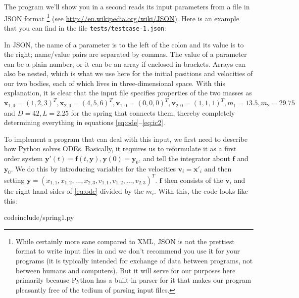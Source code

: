 \documentclass{article}
\begin{document}
The program we'll show you in a second reads its input parameters from a file in JSON format%
\footnote{While certainly more sane compared to XML, JSON is not the prettiest format to write input files in and we
  don't recommend you use it for your programs (it is typically intended for
  exchange of data between programs, not between humans and computers). But it
  will serve for our purposes here primarily because Python has a built-in
  parser for it that makes our program pleasantly free of the tedium of
  parsing input files.} (see
\url{http://en.wikipedia.org/wiki/JSON}).
Here is an example that you can find in the file \texttt{tests/testcase-1.json}:

In JSON, the name of a parameter is to the left of the colon and its value is
to the right; name/value pairs are separated by commas. The value of a
parameter can be a plain number, or it can be an array if enclosed in
brackets. Arrays can also be nested, which is what we use here for the initial
positions and velocities of our two bodies, each of which lives in
three-dimensional space. With this explanation, it is clear that the input file
specifies properties of the two masses as $\mathbf x_{1,0}=(1,2,3)^T, \mathbf
x_{2,0}=(4,5,6)^T, \mathbf v_{1,0}=(0,0,0)^T, \mathbf v_{2,0}=(1,1,1)^T,
m_1=13.5, m_2=29.75$ and $D=42, L=2.25$ for the spring that connects them, 
thereby completely determining everything in equations
\eqref{eq:ode}--\eqref{eq:ic2}.

To implement a program that can deal with this input, we first need to
describe how Python solves ODEs. Basically, it requires us to reformulate it
as a first order system $\mathbf y'(t)=\mathbf f(t,\mathbf y), \mathbf
y(0)=\mathbf y_0$, and tell the integrator about $\mathbf f$ and $\mathbf
y_0$. We do this by introducing variables for the velocities $\mathbf v_i=\mathbf x'_i$ and then
setting $\mathbf
y=(x_{1,1},x_{1,2},\ldots,x_{2,3},v_{1,1},v_{1,2},\ldots,v_{2,3})^T$. $\mathbf
f$ then consists of the $\mathbf v_i$ and the right hand sides of
\eqref{eq:ode} divided by the $m_i$. With this, the code looks like this:


{codeinclude/spring1.py}
\end{document}
